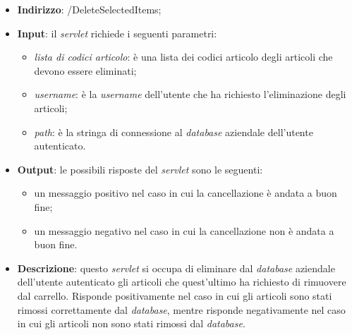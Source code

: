 \begin{itemize}
	\item \textbf{Indirizzo}: /DeleteSelectedItems;
	\item \textbf{Input}: il \textit{servlet} richiede i seguenti parametri:
		\begin{itemize}
			\item \textit{lista di codici articolo}: è una lista dei codici articolo degli articoli che devono essere eliminati;
			\item \textit{username}: è la \textit{username} dell'utente che ha richiesto l'eliminazione degli articoli;
			\item \textit{path}: è la stringa di connessione al \textit{database} aziendale dell'utente autenticato.
		\end{itemize}
	\item \textbf{Output}: le possibili risposte del \textit{servlet} sono le seguenti:
		\begin{itemize}
			\item un messaggio positivo nel caso in cui la cancellazione è andata a buon fine;
			\item un messaggio negativo nel caso in cui la cancellazione non è andata a buon fine.
		\end{itemize}
	\item \textbf{Descrizione}: questo \textit{servlet} si occupa di eliminare dal \textit{database} aziendale dell'utente autenticato gli articoli che quest'ultimo ha richiesto di rimuovere dal carrello. Risponde positivamente nel caso in cui gli articoli sono stati rimossi correttamente dal \textit{database}, mentre risponde negativamente nel caso in cui gli articoli non sono stati rimossi dal \textit{database}.
\end{itemize}


